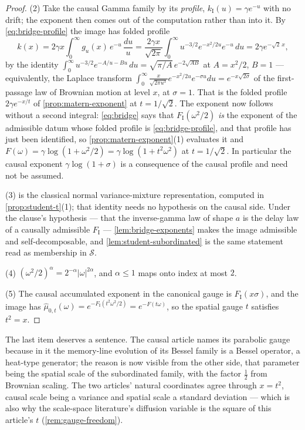 \begin{proof}
(2) Take the causal Gamma family by its \emph{profile}, $k_{\mathrm I}(u) = \gamma e^{-u}$ with
no drift; the exponent then comes out of the computation rather than into it. By
\ref{eq:bridge-profile} the image has folded profile
\[
  k(x) = 2\gamma x\int_0^\infty g_u(x)\,e^{-u}\,\frac{du}{u}
       = \frac{2\gamma x}{\sqrt{2\pi}}\int_0^\infty u^{-3/2}e^{-x^2/2u}e^{-u}\,du
       = 2\gamma e^{-\sqrt2\,x},
\]
by the identity $\int_0^\infty u^{-3/2}e^{-A/u - Bu}\,du = \sqrt{\pi/A}\,e^{-2\sqrt{AB}}$ at
$A = x^2/2$, $B = 1$ --- equivalently, the Laplace transform
$\int_0^\infty \frac{x}{\sqrt{2\pi u^3}}e^{-x^2/2u}e^{-\sigma u}du = e^{-x\sqrt{2\sigma}}$ of the
first-passage law of Brownian motion at level $x$, at $\sigma = 1$. That is the folded profile
$2\gamma e^{-x/t}$ of \ref{prop:matern-exponent} at $t = 1/\sqrt2$. The exponent now follows
without a second integral: \ref{eq:bridge} says that $F_{\mathrm I}(\omega^2/2)$ \emph{is} the
exponent of the admissible datum whose folded profile is \ref{eq:bridge-profile}, and that
profile has just been identified, so \ref{prop:matern-exponent}(1) evaluates it and
$F(\omega) = \gamma\log(1 + \omega^2/2) = \gamma\log(1 + t^2\omega^2)$ at $t = 1/\sqrt2$. In
particular the causal exponent $\gamma\log(1+\sigma)$ is a consequence of the causal profile and
need not be assumed.

(3) is the classical normal variance-mixture representation, computed in
\ref{prop:student-t}(1); that identity needs no hypothesis on the causal side. Under the clause's
hypothesis --- that the inverse-gamma law of shape $a$ is the delay law of a causally admissible
$F_{\mathrm I}$ --- \ref{lem:bridge-exponents} makes the image admissible and
self-decomposable, and \ref{lem:student-subordinated} is the same statement read as membership in
$\mathcal{S}$.

(4) $(\omega^2/2)^\alpha = 2^{-\alpha}|\omega|^{2\alpha}$, and $\alpha \le 1$ maps onto index
at most $2$.

(5) The causal accumulated exponent in the canonical gauge is $F_{\mathrm I}(x\sigma)$, and the
image has $\hat\mu_{0,t}(\omega) = e^{-F_{\mathrm I}(t^2\omega^2/2)} = e^{-F(t\omega)}$, so the
spatial gauge $t$ satisfies $t^2 = x$.
\end{proof}

The last item deserves a sentence. The causal article names its parabolic gauge because in it
the memory-line evolution of its Bessel family is a Bessel operator, a heat-type generator; the
reason is now visible from the other side, that parameter being the spatial scale of the
subordinated family, with the factor $\tfrac12$ from Brownian scaling. The two articles'
natural coordinates agree through $x = t^2$, causal scale being a variance and spatial scale a
standard deviation --- which is also why the scale-space literature's diffusion variable is the
square of this article's $t$ (\ref{rem:gauge-freedom}).

